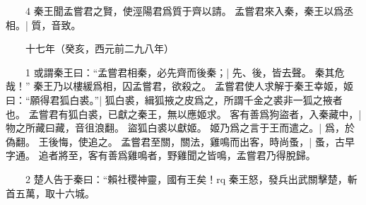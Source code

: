 　　4 秦王聞孟嘗君之賢，使涇陽君爲質于齊以請。
	孟嘗君來入秦，秦王以爲丞相。|{
	質，音致。
}

　　十七年（癸亥，西元前二九八年）

　　1 或謂秦王曰：“孟嘗君相秦，必先齊而後秦；|{
	先、後，皆去聲。
}
秦其危哉！”
秦王乃以樓緩爲相，囚孟嘗君，欲殺之。
	孟嘗君使人求解于秦王幸姬，姬曰：“願得君狐白裘。”|{
	狐白裘，緝狐掖之皮爲之，所謂千金之裘非一狐之掖者也。
}
孟嘗君有狐白裘，已獻之秦王，無以應姬求。
	客有善爲狗盜者，入秦藏中，|{
	物之所藏曰藏，音徂浪翻。
}
盜狐白裘以獻姬。
	姬乃爲之言于王而遣之。|{
	爲，於偽翻。
}
王後悔，使追之。
	孟嘗君至關，關法，雞鳴而出客，時尚蚤，|{
	蚤，古早字通。
}
追者將至，客有善爲雞鳴者，野雞聞之皆鳴，孟嘗君乃得脫歸。


　　2 楚人告于秦曰：“賴社稷神靈，國有王矣！rq
秦王怒，發兵出武關擊楚，斬首五萬，取十六城。


